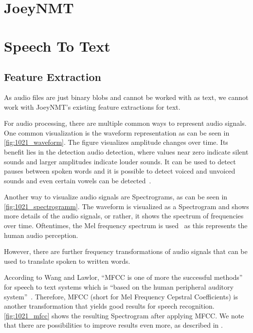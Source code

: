 \documentclass[11pt,a4paper]{article}
\begin{document}
\section{JoeyNMT}


\section{Speech To Text}


\subsection{Feature Extraction}

As audio files are just binary blobs and cannot be worked with as text,
we cannot work with JoeyNMT's existing feature extractions for text.

For audio processing, there are multiple common ways to represent audio signals.
One common visualization is the waveform representation as can be seen in \autoref{fig:1021_waveform}.
The figure visualizes amplitude changes over time.
Its benefit lies in the detection audio detection, where values near zero indicate silent sounds and larger amplitudes indicate louder sounds.
It can be used to detect pauses between spoken words and it is possible to detect voiced and unvoiced sounds and even certain vowels can be detected~\cite{Comer_1162014}.

Another way to visualize audio signals are Spectrograms, as can be seen in \autoref{fig:1021_spectrogramm}.
The waveform is visualized as a Spectrogram and shows more details of the audio signals, or rather, it shows the spectrum of frequencies over time.
Oftentimes, the Mel frequency spectrum is used~\cite{MelFreq} as this represents the human audio perception.

However, there are further frequency transformations of audio signals
that can be used to translate spoken to written words.

According to Wang and Lawlor, \enquote{MFCC is one of more the successful methods} for speech to text systems which is \enquote{based on the human peripheral auditory system}~\cite{Wang_7983644}.
Therefore, MFCC (short for Mel Frequency Cepstral Coefficients) is another transformation that yields good results for speech recognition.
\autoref{fig:1021_mfcc} shows the resulting Spectrogram after applying MFCC.
We note that there are possibilities to improve results even more, as described in \cite{Winursito_8350748}.
\end{document}
